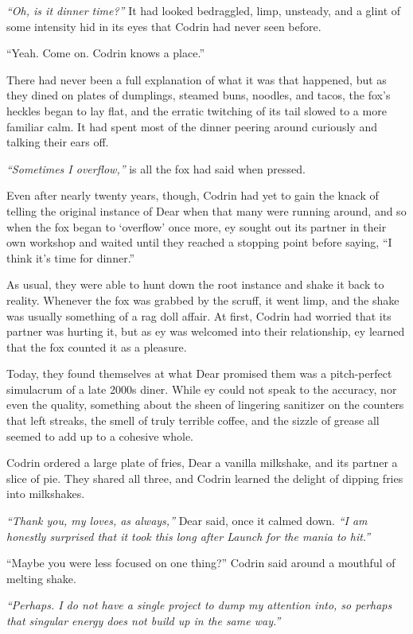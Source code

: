 \emph{``Oh, is it dinner time?''} It had looked bedraggled, limp, unsteady, and a glint of some intensity hid in its eyes that Codrin had never seen before.

``Yeah. Come on. Codrin knows a place.''

There had never been a full explanation of what it was that happened, but as they dined on plates of dumplings, steamed buns, noodles, and tacos, the fox's heckles began to lay flat, and the erratic twitching of its tail slowed to a more familiar calm. It had spent most of the dinner peering around curiously and talking their ears off.

\emph{``Sometimes I overflow,''} is all the fox had said when pressed.

Even after nearly twenty years, though, Codrin had yet to gain the knack of telling the original instance of Dear when that many were running around, and so when the fox began to `overflow' once more, ey sought out its partner in their own workshop and waited until they reached a stopping point before saying, ``I think it's time for dinner.''

As usual, they were able to hunt down the root instance and shake it back to reality. Whenever the fox was grabbed by the scruff, it went limp, and the shake was usually something of a rag doll affair. At first, Codrin had worried that its partner was hurting it, but as ey was welcomed into their relationship, ey learned that the fox counted it as a pleasure.

Today, they found themselves at what Dear promised them was a pitch-perfect simulacrum of a late 2000s diner. While ey could not speak to the accuracy, nor even the quality, something about the sheen of lingering sanitizer on the counters that left streaks, the smell of truly terrible coffee, and the sizzle of grease all seemed to add up to a cohesive whole.

Codrin ordered a large plate of fries, Dear a vanilla milkshake, and its partner a slice of pie. They shared all three, and Codrin learned the delight of dipping fries into milkshakes.

\emph{``Thank you, my loves, as always,''} Dear said, once it calmed down. \emph{``I am honestly surprised that it took this long after Launch for the mania to hit.''}

``Maybe you were less focused on one thing?'' Codrin said around a mouthful of melting shake.

\emph{``Perhaps. I do not have a single project to dump my attention into, so perhaps that singular energy does not build up in the same way.''}


